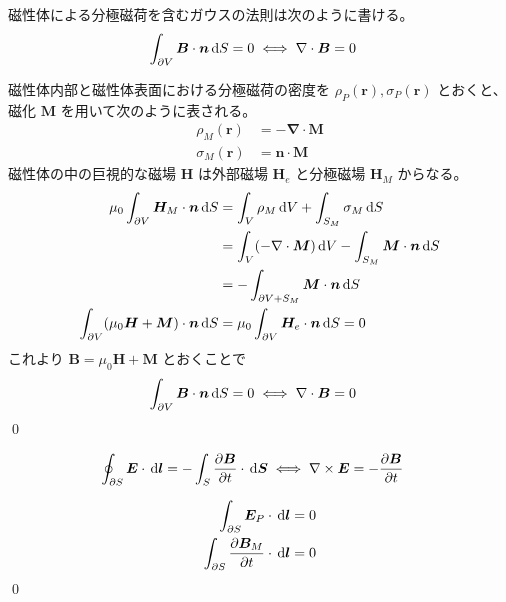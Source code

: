 \documentclass[uplatex,dvipdfmx,a4paper,11pt]{jlreq}
\makeatletter
\newcommand{\EE}{\bm{E}}
\newcommand{\BB}{\bm{B}}
\newcommand{\HH}{\bm{H}}
\newcommand{\MM}{\bm{M}}
\newcommand{\rr}{\bm{r}}
\renewcommand{\SS}{\bm{S}}
\newcommand{\vnabla}{\mathbf{\nabla}}
\numberwithin{equation}{section}
\theoremstyle{definition}
\renewenvironment{proof}[1][\proofname]{\par
  \normalfont
  \topsep6\p@\@plus6\p@ \trivlist
  \item[\hskip\labelsep{\bfseries #1}\@addpunct{\bfseries}]\ignorespaces\quad\par
}{%
  \qed\endtrivlist\@endpefalse
}
\renewcommand\proofname{証明}
\makeatother
\begin{document}
\begin{theorem}[磁場におけるガウスの法則]
  磁性体による分極磁荷を含むガウスの法則は次のように書ける。
  \begin{align}
    \int_{\partial V}\BB\cdot\bm{n}\dl{S} & = 0 \iff \vnabla\cdot\BB = 0
  \end{align}
\end{theorem}
\begin{proof}
  磁性体内部と磁性体表面における分極磁荷の密度を $\rho_P(\rr), \sigma_P(\rr)$ とおくと、磁化 $\MM$ を用いて次のように表される。
  \begin{align}
    \rho_M(\rr)   & = - \vnabla\cdot\MM \\
    \sigma_M(\rr) & = \bm{n}\cdot\MM
  \end{align}
  磁性体の中の巨視的な磁場 $\HH$ は外部磁場 $\HH_e$ と分極磁場 $\HH_M$ からなる。
  \begin{align}
    \mu_0\int_{\partial V}\HH_M\cdot\bm{n}\dl{S}       & = \int_V\rho_M\dl{V} + \int_{S_M}\sigma_M\dl{S}                   \\
                                                       & = \int_V(-\vnabla\cdot\MM)\dl{V} - \int_{S_M}\MM\cdot\bm{n}\dl{S} \\
                                                       & = -\int_{\partial V + S_M}\MM\cdot\bm{n}\dl{S}                    \\
    \int_{\partial V}(\mu_0\HH + \MM)\cdot\bm{n}\dl{S} & = \mu_0\int_{\partial V}\HH_e\cdot\bm{n}\dl{S} = 0
  \end{align}
  これより $\BB = \mu_0\HH + \MM$ とおくことで
  \begin{align}
    \int_{\partial V}\BB\cdot\bm{n}\dl{S} & = 0 \iff \vnabla\cdot\BB = 0
  \end{align}
\end{proof}

\begin{theorem}[ファラデーの電磁誘導の法則]
  \begin{align}
    \oint_{\partial S}\EE\cdot\dl{\bm{l}} = -\int_S\diffp{\BB}{t}\cdot\dl{\SS} & \iff \vnabla\times\EE = -\diffp{\BB}{t}
  \end{align}
\end{theorem}
\begin{proof}
  \begin{align}
    \int_{\partial S}\EE_P\cdot\dl{\bm{l}} = 0 \\
    \int_{\partial S}\diffp{\BB_M}{t}\cdot\dl{\bm{l}} = 0
  \end{align}
\end{proof}
\end{document}
